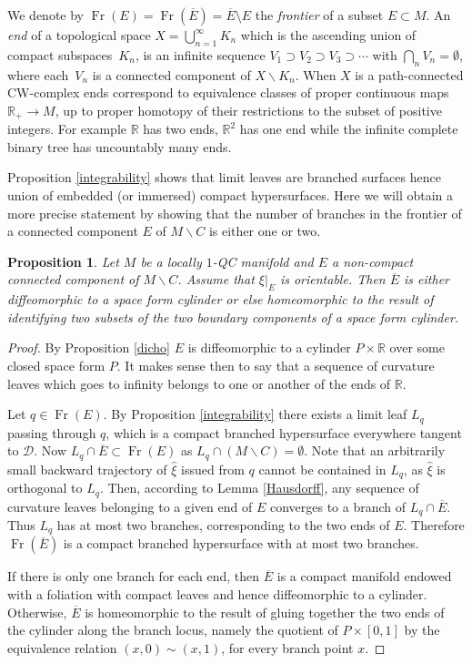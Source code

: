 \documentclass[JEP,XML,SOM,Unicode]{cedram}
\let\mathcal\mathscr
\let\moins\smallsetminus
\DeclareMathOperator{\Fr}{Fr}
\newtheorem{proposition}[theorem]{Proposition}
\theoremstyle{definition}
\theoremstyle{remark}
\numberwithin{equation}{section}
\newcommand{\RR}{\mathbb R}
\begin{document}
We denote by $\Fr(E)=\Fr(\overline{E})=\overline{E}\setminus E$ the \emph{frontier} of a subset $E\subset M$.
An \emph{end} of a topological space $X=\bigcup_{n=1}^{\infty}K_n$ which is the ascending union of compact subspaces~$K_n$,
is an infinite sequence $V_1\supset V_2 \supset V_3 \supset \cdots$ with $\bigcap_n V_n=\emptyset$, where
each~$V_n$ is a connected component of $X\moins K_n$. When $X$ is a path-connected CW\nobreakdash-complex ends correspond to
equivalence classes of proper continuous maps $\RR_+\to M$,
up to proper homotopy of their restrictions to the subset of positive integers.
For example $\RR$ has two ends, $\RR^2$ has one end while
the infinite complete binary tree has uncountably many ends.

Proposition \ref{integrability} shows that limit leaves are branched surfaces hence union of embedded (or immersed)
compact hypersurfaces. Here we will obtain a more precise statement by showing that the number of branches
in the frontier of a connected component $E$ of $M\moins C$ is either one or two.

\begin{proposition}\label{bdy}
Let $M$ be a locally $1$-QC manifold and $E$ a non-compact connected component of $M\moins C$. Assume that $\xi|_E$ is orientable.
Then $\overline{E}$ is either diffeomorphic to a space form cylinder or else homeomorphic to the result of identifying
two subsets of the two boundary components of a space form cylinder.
\end{proposition}
\begin{proof}
By Proposition \ref{dicho} $E$ is diffeomorphic to a cylinder $P\times \RR$ over some closed
space form $P$.
It makes sense then to say that a sequence of curvature leaves which goes to infinity
belongs to one or another of the ends of $\RR$.

Let $q\in \Fr(E)$. By Proposition \ref{integrability} there exists a limit leaf $L_q$ passing through $q$, which is a compact branched hypersurface everywhere tangent to $\mathcal D$. Now $L_q\cap \overline{E}\subset \Fr(E)$ as $L_q\cap (M\moins C)=\emptyset$.
Note that an arbitrarily small backward trajectory of $\widehat{\xi}$ issued from $q$
cannot be contained in $L_q$, as $\widehat{\xi}$ is orthogonal to $L_q$. Then, according to Lemma \ref{Hausdorff}, any sequence of curvature leaves belonging to a
given end of $E$ converges to a branch of $L_q\cap \overline{E}$.
Thus $L_q$ has at most two branches, corresponding to the two ends of $E$.
Therefore $\Fr(\overline{E})$ is a compact branched hypersurface with at most two branches.

If there is only one branch for each end, then $\overline{E}$ is a compact manifold endowed with a foliation with compact leaves and
hence diffeomorphic to a cylinder. Otherwise, $\overline{E}$ is homeomorphic to the
result of gluing together the two ends of the cylinder along
the branch locus, namely the quotient of $P\times [0,1]$ by the equivalence relation
$(x,0)\sim (x,1)$, for every branch point $x$.
\end{proof}
\end{document}
